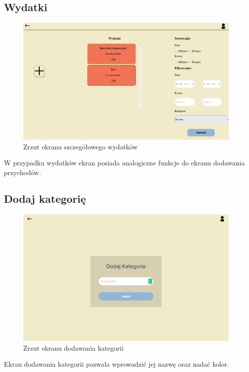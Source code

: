 \documentclass[12pt,a4paper,oneside]{article}
\begin{document}
\subsection{Wydatki}
\begin{figure}[H]
    \centering
    \includegraphics[width=\hsize,keepaspectratio]{images/expenses_card.png}
    \caption{Zrzut ekranu szczegółowego wydatków}
\end{figure}
W przypadku wydatków ekran posiada analogiczne funkcje do ekranu dodawania
przychodów.

\subsection{Dodaj kategorię}
\begin{figure}[H]
    \centering
    \includegraphics[width=\hsize,keepaspectratio]{images/add_category.png}
    \caption{Zrzut ekranu dodawania kategorii}
\end{figure}
Ekran dodawania kategorii pozwala wprowadzić jej nazwę oraz nadać kolor.
\end{document}

